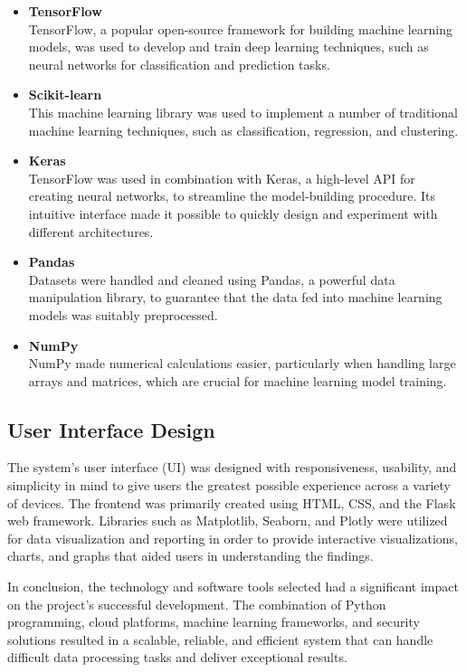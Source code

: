\begin{itemize}
    \item \textbf{TensorFlow} \\
TensorFlow, a popular open-source framework for building machine learning models, was used to develop and train deep learning techniques, such as neural networks for classification and prediction tasks.
    
    \item \textbf{Scikit-learn} \\
This machine learning library was used to implement a number of traditional machine learning techniques, such as classification, regression, and clustering.

\item \textbf{Keras}\\
TensorFlow was used in combination with Keras, a high-level API for creating neural networks, to streamline the model-building procedure. Its intuitive interface made it possible to quickly design and experiment with different architectures.

    \item \textbf{Pandas} \\
Datasets were handled and cleaned using Pandas, a powerful data manipulation library, to guarantee that the data fed into machine learning models was suitably preprocessed.

    \item \textbf{NumPy} \\
NumPy made numerical calculations easier, particularly when handling large arrays and matrices, which are crucial for machine learning model training.
\end{itemize}

\subsection{
User Interface Design }
The system's user interface (UI) was designed with responsiveness, usability, and simplicity in mind to give users the greatest possible experience across a variety of devices. The frontend was primarily created using HTML, CSS, and the Flask web framework.
Libraries such as Matplotlib, Seaborn, and Plotly were utilized for data visualization and reporting in order to provide interactive visualizations, charts, and graphs that aided users in understanding the findings.

In conclusion, the technology and software tools selected had a significant impact on the project's successful development. The combination of Python programming, cloud platforms, machine learning frameworks, and security solutions resulted in a scalable, reliable, and efficient system that can handle difficult data processing tasks and deliver exceptional results. 